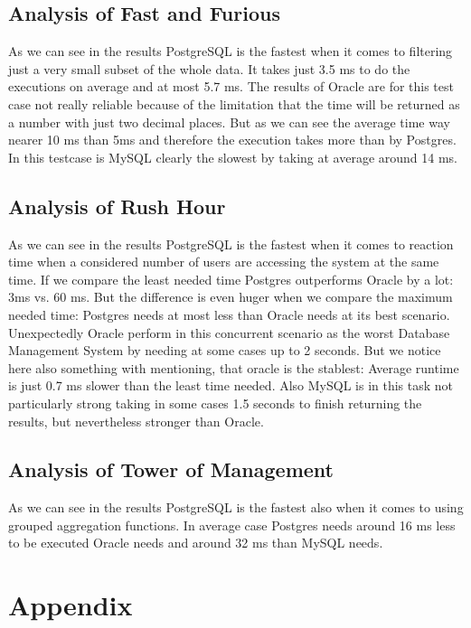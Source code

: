 \documentclass[runningheads]{llncs}
\begin{document}
\subsection{Analysis of Fast and Furious}
As we can see in the results PostgreSQL is the fastest when it comes to filtering just a very small subset of the whole data. It takes just 3.5 ms to do the executions on average and at most 5.7 ms. The results of Oracle are for this test case not really reliable because of the limitation that the time will be returned as a number with just two decimal places. But as we can see the average time way nearer 10 ms than 5ms and therefore the execution takes more than by Postgres. In this testcase is MySQL clearly the slowest by taking at average around 14 ms.

\subsection{Analysis of Rush Hour}
As we can see in the results PostgreSQL is the fastest when it comes to reaction time when a considered number of users are accessing the system at the same time. If we compare the least needed time Postgres outperforms Oracle by a lot: 3ms vs. 60 ms. But the difference is even huger when we compare the maximum needed time: Postgres needs at most less than Oracle needs at its best scenario. Unexpectedly Oracle perform in this concurrent scenario as the worst Database Management System by needing at some cases up to 2 seconds. But we notice here also something with mentioning, that oracle is the stablest: Average runtime is just 0.7 ms slower than the least time needed. Also MySQL is in this task not particularly strong taking in some cases 1.5 seconds to finish returning the results, but nevertheless stronger than Oracle.

\subsection{Analysis of Tower of Management}
As we can see in the results PostgreSQL is the fastest also when it comes to using grouped aggregation functions. In average case Postgres needs around 16 ms less to be executed Oracle needs and around 32 ms than MySQL needs. 


%
%
%
% 
% 
%

\section{Appendix}
%
\end{document}

